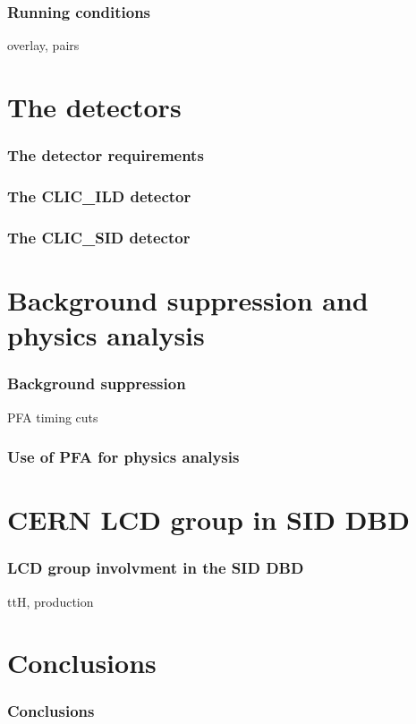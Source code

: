 \documentclass{beamer}
\begin{document}
\begin{frame}
\frametitle{Running conditions}
overlay, pairs
\end{frame}

\section{The detectors}
\begin{frame}
\frametitle{The detector requirements}

\end{frame}
\begin{frame}
\frametitle{The CLIC\_ILD detector}
\end{frame}
\begin{frame}
\frametitle{The CLIC\_SID detector}
\end{frame}

\section[Bkg suppression \& phys. analysis]{Background suppression and physics
analysis}
\begin{frame}
\frametitle{Background suppression}
PFA timing cuts
\end{frame}

\begin{frame}
\frametitle{Use of PFA for physics analysis}
\end{frame}

\section[LCD for the DBD]{CERN LCD group in SID DBD}
\begin{frame}
\frametitle{LCD group involvment in the SID DBD}
ttH, production
\end{frame}

\section{Conclusions}
\begin{frame}
\frametitle{Conclusions}

\end{frame}
\end{document}
